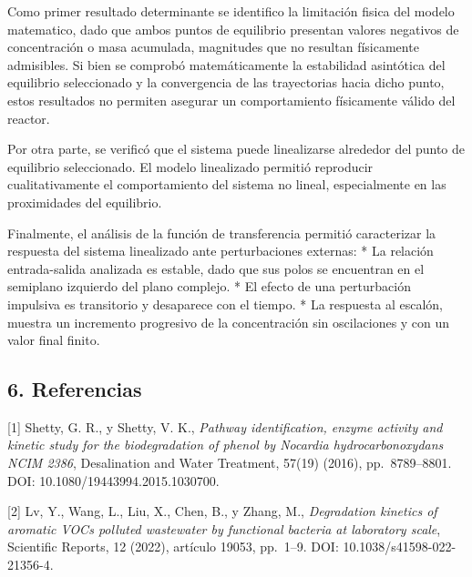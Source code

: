 \documentclass[11pt]{article}
\begin{document}
Como primer resultado determinante se identifico la limitación fisica
del modelo matematico, dado que ambos puntos de equilibrio presentan
valores negativos de concentración o masa acumulada, magnitudes que no
resultan físicamente admisibles. Si bien se comprobó matemáticamente la
estabilidad asintótica del equilibrio seleccionado y la convergencia de
las trayectorias hacia dicho punto, estos resultados no permiten
asegurar un comportamiento físicamente válido del reactor.

Por otra parte, se verificó que el sistema puede linealizarse alrededor
del punto de equilibrio seleccionado. El modelo linealizado permitió
reproducir cualitativamente el comportamiento del sistema no lineal,
especialmente en las proximidades del equilibrio.

Finalmente, el análisis de la función de transferencia permitió
caracterizar la respuesta del sistema linealizado ante perturbaciones
externas: * La relación entrada-salida analizada es estable, dado que
sus polos se encuentran en el semiplano izquierdo del plano complejo. *
El efecto de una perturbación impulsiva es transitorio y desaparece con
el tiempo. * La respuesta al escalón, muestra un incremento progresivo
de la concentración sin oscilaciones y con un valor final finito.

    \subsection{6. Referencias}\label{referencias}

{[}1{]} Shetty, G. R., y Shetty, V. K., \emph{Pathway identification,
enzyme activity and kinetic study for the biodegradation of phenol by
Nocardia hydrocarbonoxydans NCIM 2386}, Desalination and Water
Treatment, 57(19) (2016), pp.~8789--8801. DOI:
10.1080/19443994.2015.1030700.

{[}2{]} Lv, Y., Wang, L., Liu, X., Chen, B., y Zhang, M.,
\emph{Degradation kinetics of aromatic VOCs polluted wastewater by
functional bacteria at laboratory scale}, Scientific Reports, 12 (2022),
artículo 19053, pp.~1--9. DOI: 10.1038/s41598-022-21356-4.
\end{document}
